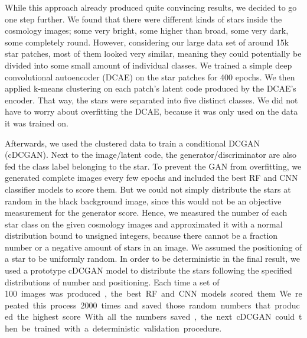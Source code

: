 \documentclass[10pt,conference,compsocconf]{IEEEtran}
\begin{document}
While this approach already produced quite convincing results, we decided to go one step further. We found that there were different kinds of stars inside the cosmology images; some very bright, some higher than broad, some very dark, some completely round. However, considering our large data set of around 15k star patches, most of them looked very similar, meaning they could potentially be divided into some small amount of individual classes. We trained a simple deep convolutional autoencoder (DCAE) on the star patches for 400 epochs. 
We then applied k-means clustering on each patch's latent code produced by the DCAE's encoder. That way, the stars were separated into five distinct classes. We did not have to worry about overfitting the DCAE, because it was only used on the data it was trained on.

Afterwards, we used the clustered data to train a conditional DCGAN (cDCGAN). Next to the image/latent code, the generator/discriminator are also fed the class label belonging to the star. To prevent the GAN from overfitting, we generated complete images every few epochs and included the best RF and CNN classifier models to score them. But we could not simply distribute the stars at random in the black background image, since this would not be an objective measurement for the generator score.
Hence, we measured the number of each star class on the given cosmology images and approximated it with a normal distribution bound to unsigned integers, because there cannot be a fraction number or a negative amount of stars in an image. We assumed the positioning of a star to be uniformly random. In order to be deterministic in the final result, we used a prototype cDCGAN model to distribute the stars following the specified distributions of number and positioning. Each time a set of \SI{100} images was produced, the best RF and CNN models scored them. We repeated this process \SI{2000} times and saved those random numbers that produced the highest score. With all the numbers saved, the next cDCGAN could then be trained with a deterministic validation procedure. 
\end{document}
